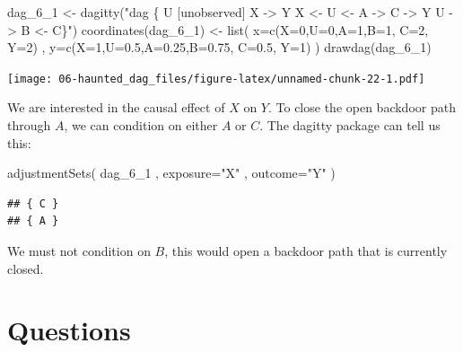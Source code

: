 \documentclass[
]{book}
\newenvironment{Shaded}{\begin{snugshade}}{\end{snugshade}}
\newcommand{\AttributeTok}[1]{\textcolor[rgb]{0.77,0.63,0.00}{#1}}
\newcommand{\DecValTok}[1]{\textcolor[rgb]{0.00,0.00,0.81}{#1}}
\newcommand{\FloatTok}[1]{\textcolor[rgb]{0.00,0.00,0.81}{#1}}
\newcommand{\FunctionTok}[1]{\textcolor[rgb]{0.00,0.00,0.00}{#1}}
\newcommand{\NormalTok}[1]{#1}
\newcommand{\OtherTok}[1]{\textcolor[rgb]{0.56,0.35,0.01}{#1}}
\newcommand{\StringTok}[1]{\textcolor[rgb]{0.31,0.60,0.02}{#1}}
\begin{document}
\begin{Shaded}
\begin{Highlighting}[]
\NormalTok{dag\_6\_1 }\OtherTok{\textless{}{-}} \FunctionTok{dagitty}\NormalTok{(}\StringTok{"dag \{ U [unobserved] X {-}\textgreater{} Y X \textless{}{-} U \textless{}{-} A {-}\textgreater{} C {-}\textgreater{} Y U {-}\textgreater{} B \textless{}{-} C\}"}\NormalTok{)}
\FunctionTok{coordinates}\NormalTok{(dag\_6\_1) }\OtherTok{\textless{}{-}} \FunctionTok{list}\NormalTok{( }\AttributeTok{x=}\FunctionTok{c}\NormalTok{(}\AttributeTok{X=}\DecValTok{0}\NormalTok{,}\AttributeTok{U=}\DecValTok{0}\NormalTok{,}\AttributeTok{A=}\DecValTok{1}\NormalTok{,}\AttributeTok{B=}\DecValTok{1}\NormalTok{, }\AttributeTok{C=}\DecValTok{2}\NormalTok{, }\AttributeTok{Y=}\DecValTok{2}\NormalTok{) , }\AttributeTok{y=}\FunctionTok{c}\NormalTok{(}\AttributeTok{X=}\DecValTok{1}\NormalTok{,}\AttributeTok{U=}\FloatTok{0.5}\NormalTok{,}\AttributeTok{A=}\FloatTok{0.25}\NormalTok{,}\AttributeTok{B=}\FloatTok{0.75}\NormalTok{, }\AttributeTok{C=}\FloatTok{0.5}\NormalTok{, }\AttributeTok{Y=}\DecValTok{1}\NormalTok{) )}
\FunctionTok{drawdag}\NormalTok{(dag\_6\_1)}
\end{Highlighting}
\end{Shaded}

\texttt{[image: 06-haunted\_dag\_files/figure-latex/unnamed-chunk-22-1.pdf]}

We are interested in the causal effect of \(X\) on \(Y\). To close the open backdoor path through \(A\), we can condition on either \(A\) or \(C\). The dagitty package can tell us this:

\begin{Shaded}
\begin{Highlighting}[]
\FunctionTok{adjustmentSets}\NormalTok{( dag\_6\_1 , }\AttributeTok{exposure=}\StringTok{"X"}\NormalTok{ , }\AttributeTok{outcome=}\StringTok{"Y"}\NormalTok{ )}
\end{Highlighting}
\end{Shaded}

\begin{verbatim}
## { C }
## { A }
\end{verbatim}

We must not condition on \(B\), this would open a backdoor path that is currently closed.

\hypertarget{questions-5}{%
\section{Questions}\label{questions-5}}
\end{document}
